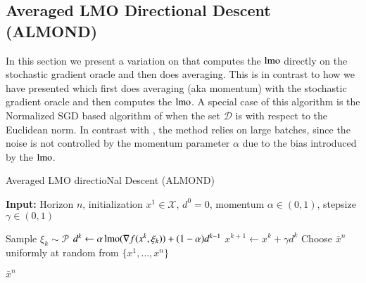 \begin{toappendix}

\subsection{Averaged LMO Directional Descent (ALMOND)}\label{subsec:almond}
In this section we present a variation on  that computes the $\operatorname{lmo}$ directly on the stochastic gradient oracle and then does averaging. This is in contrast to how we have presented  which first does averaging (aka momentum) with the stochastic gradient oracle and then computes the $\operatorname{lmo}$. 
A special case of this algorithm is the Normalized SGD based algorithm of \citet{zhao2020stochastic} when the set $\mathcal{D}$ is with respect to the Euclidean norm. 
In contrast with , the method relies on large batches, since the noise is not controlled by the momentum parameter $\alpha$ due to the bias introduced by the $\operatorname{lmo}$.

\begin{algorithm}
\caption{Averaged LMO directioNal Descent (ALMOND)}
\label{alg:ALMOND}
\textbf{Input:} Horizon $n$, initialization $x^1 \in \mathcal X$, $d^0 = 0$, momentum $\alpha \in (0,1)$, stepsize $\gamma \in (0,1)$
\begin{algorithmic}[1]
        \State Sample $\xi_{k}\sim \mathcal P$
        \State $d^{k} \gets \alpha \operatorname{lmo}(\nabla f(x^{k}, \xi_{k})) + (1 - \alpha)d^{k-1}$
        \State $x^{k+1} \gets x^k + \gamma d^k$
    \EndFor
    \State Choose $\bar{x}^n$ uniformly at random from $\{x^1, \dots, x^n\}$
    \item[\algfont{Return}] $\bar{x}^n$
\end{algorithmic}
\end{algorithm}


\end{toappendix}
